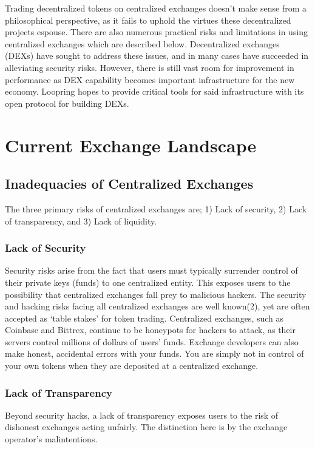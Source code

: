 \documentclass[UTF8,nofonts]{article}
\begin{document}
Trading decentralized tokens on centralized exchanges doesn’t make sense from a philosophical perspective, as it fails to uphold the virtues these decentralized projects espouse. There are also numerous practical risks and limitations in using centralized exchanges which are described below. Decentralized exchanges (DEXs) have sought to address these issues, and in many cases have succeeded in alleviating security risks. However, there is still vast room for improvement in performance as DEX capability becomes important infrastructure for the new economy. Loopring hopes to provide critical tools for said infrastructure with its open protocol for building DEXs. 

\section{Current Exchange Landscape\label{sec:current_exchange_landscape}}

\subsection{Inadequacies of Centralized Exchanges}
The three primary risks of centralized exchanges are; 1) Lack of security, 2) Lack of transparency, and 3) Lack of liquidity.

\subsubsection{Lack of Security}
Security risks arise from the fact that users must typically surrender control of their private keys (funds) to one centralized entity. This exposes users to the possibility that centralized exchanges fall prey to malicious hackers. The security and hacking risks facing all centralized exchanges are well known(2), yet are often accepted as ‘table stakes’ for token trading. Centralized exchanges, such as Coinbase and Bittrex, continue to be honeypots for hackers to attack, as their servers control millions of dollars of users’ funds. Exchange developers can also make honest, accidental errors with your funds. You are simply not in control of your own tokens when they are deposited at a centralized exchange.

\subsubsection{Lack of Transparency}
Beyond security hacks, a lack of transparency exposes users to the risk of dishonest exchanges acting unfairly. The distinction here is by the exchange operator’s malintentions. 
\end{document}

